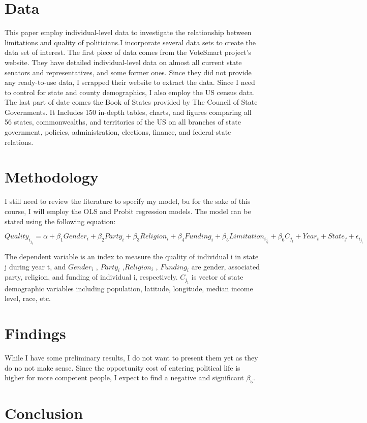 \documentclass{article}
\begin{document}
\section{Data}
This paper employ individual-level data to investigate the relationship between limitations and quality of politicians.I incorporate several data sets to create the data set of interest. \newline The first piece of data comes from the VoteSmart project's website. They have detailed individual-level data on almost all current state senators and representatives, and some former ones. Since they did not provide any ready-to-use data, I scrapped their website to extract the data.\newline 
Since I need to control for state and county demographics, I also employ the US census data. The last part of date comes the Book of States provided by The Council of State Governments. It Includes 150 in-depth tables, charts, and figures comparing all 56 states, commonwealths, and territories of the US on all branches of state government, policies, administration, elections, finance, and federal-state relations.

\section*{Methodology}
I still need to review the literature to specify my model, bu for the sake of this course, I will employ the OLS and Probit regression models. The model can be stated using the following equation:


$Quality_i_j_t = \alpha + \beta_1 Gender_i + \beta_2 Party_i + \beta_3 Religion_i + \beta_4 Funding_i + \beta_5 Limitation_i_j_t + \beta_6 C_j_t + Year_t + State_j + \epsilon_i_j_t $



The dependent variable is an index to measure the quality of individual i in state j during year t, and  $Gender_i$ ,  $Party_i$ ,$Religion_i$ ,  $Funding_i$  are gender, associated party, religion, and funding of individual i, respectively. $C_j_t$ is vector of state demographic variables including population, latitude, longitude, median income level, race, etc.

\section*{Findings}
While I have some preliminary results, I do not want to present them yet as they do no not make sense. Since the opportunity cost of entering political life is higher for more competent people, I expect to find a negative and significant $\beta_5$.

\section*{Conclusion}


\newpage



\nocite{*}

\end{document}
